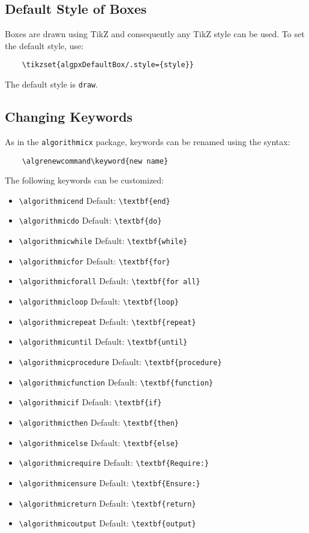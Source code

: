 \documentclass[11pt,a4paper,USenglish]{article}
\begin{document}
\subsection{Default Style of Boxes}\label{sec:defBoxStyle}
Boxes are drawn using TikZ and consequently any TikZ style can be used. To set the default style, use:
\begin{verbatim}
	\tikzset{algpxDefaultBox/.style={style}}
\end{verbatim}
The default style is \verb|draw|.


\subsection{Changing Keywords}
As in the \texttt{algorithmicx} package, keywords can be renamed using the syntax:
\begin{verbatim}
	\algrenewcommand\keyword{new name}
\end{verbatim}
The following keywords can be customized:
\begin{itemize}
	\item \verb|\algorithmicend|
	\hfill Default: \verb|\textbf{end}|
	\item \verb|\algorithmicdo|
	\hfill Default: \verb|\textbf{do}|
	\item \verb|\algorithmicwhile|
	\hfill Default: \verb|\textbf{while}|
	\item \verb|\algorithmicfor|
	\hfill Default: \verb|\textbf{for}|
	\item \verb|\algorithmicforall|
	\hfill Default: \verb|\textbf{for all}|
	\item \verb|\algorithmicloop|
	\hfill Default: \verb|\textbf{loop}|
	\item \verb|\algorithmicrepeat|
	\hfill Default: \verb|\textbf{repeat}|
	\item \verb|\algorithmicuntil|
	\hfill Default: \verb|\textbf{until}|
	\item \verb|\algorithmicprocedure|
	\hfill Default: \verb|\textbf{procedure}|
	\item \verb|\algorithmicfunction|
	\hfill Default: \verb|\textbf{function}|
	\item \verb|\algorithmicif|
	\hfill Default: \verb|\textbf{if}|
	\item \verb|\algorithmicthen|
	\hfill Default: \verb|\textbf{then}|
	\item \verb|\algorithmicelse|
	\hfill Default: \verb|\textbf{else}|
	\item \verb|\algorithmicrequire|
	\hfill Default: \verb|\textbf{Require:}|
	\item \verb|\algorithmicensure|
	\hfill Default: \verb|\textbf{Ensure:}|
	\item \verb|\algorithmicreturn|
	\hfill Default: \verb|\textbf{return}|
	\item \verb|\algorithmicoutput|
	\hfill Default: \verb|\textbf{output}|
\end{itemize}
\end{document}
